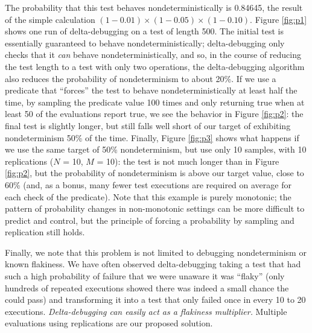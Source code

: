 The probability that this test behaves nondeterministically is
0.84645, the result of the simple calculation $(1-0.01) \times
(1-0.05) \times (1-0.10)$.  Figure \ref{fig:p1} shows one run of
delta-debugging on a test of length 500.  The initial test is
essentially guaranteed to behave nondeterministically; delta-debugging
only checks that it \emph{can} behave nondeterministically, and so, in
the course of reducing the test length to a test with only two
operations, the delta-debugging algorithm also reduces the probability
of nondeterminism to about 20\%.  If we use a predicate that
``forces'' the test to behave nondeterministically at least half the
time, by sampling the predicate value 100 times and only returning
true when at least 50 of the evaluations report true, we see the
behavior in Figure \ref{fig:p2}:  the final test is slightly longer,
but still falls well short of our target of exhibiting nondeterminism
50\% of the time.  Finally, Figure \ref{fig:p3} shows what happens if
we use the same target of 50\% nondeterminism, but use only 10
samples, with 10 replications ($N$ = 10, $M$ = 10):  the test is not
much longer than in Figure \ref{fig:p2}, but the probability of
nondeterminism is above our target value, close to 60\% (and, as a bonus, many fewer
test executions are required on average for each check of the predicate).  Note that
this example is purely monotonic; the pattern of probability changes
in non-monotonic settings can be more difficult to predict and
control, but the principle of forcing a probability by sampling and
replication still holds.

Finally, we note that this problem is not limited to debugging
nondeterminism or known flakiness.  We have often observed
delta-debugging taking a test that had such a high probability of
failure that we were unaware it was ``flaky'' (only hundreds of repeated executions showed there was
indeed a small chance the could pass) and transforming it into a
test that only failed once in every 10 to 20 executions.
\emph{Delta-debugging can easily act as a flakiness multiplier.} Multiple evaluations using replications are our proposed solution.